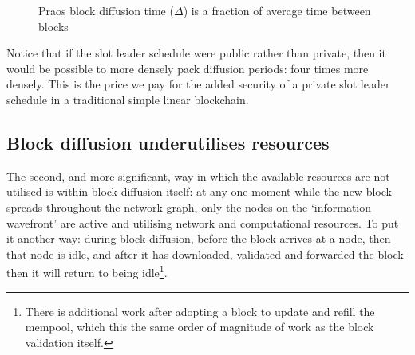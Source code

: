 \documentclass[11pt,a4paper]{article}
\begin{document}
\begin{figure}[b]
\begin{center}
\end{center}
\caption{Praos block diffusion time ($\Delta$) is a fraction of average time between blocks}
\label{fig:praos-block-diffusion}
\end{figure}

Notice that if the slot leader schedule were public rather than private, then
it would be possible to more densely pack diffusion periods: four times more
densely. This is the price we pay for the added security of a private slot
leader schedule in a traditional simple linear blockchain.

\subsection{Block diffusion underutilises resources}
\label{sec:diffusion-underutilises-resources}

The second, and more significant, way in which the available resources are not
utilised is within block diffusion itself: at any one moment while the new block
spreads throughout the network graph, only the nodes on the `information
wavefront' are active and utilising network and computational resources. To put
it another way: during block diffusion, before the block arrives at a node,
then that node is idle, and after it has downloaded, validated and forwarded
the block then it will return to being idle\footnote{There is additional work
after adopting a block to update and refill the mempool, which this the same
order of magnitude of work as the block validation itself.}.
\end{document}
